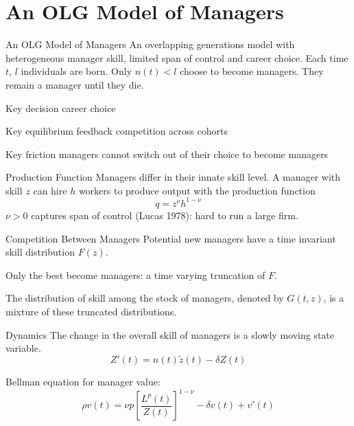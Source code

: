 \documentclass[
  ignorenonframetext,
  aspectratio=1610,
]{beamer}
\begin{document}
\hypertarget{an-olg-model-of-managers}{%
\section{An OLG Model of Managers}\label{an-olg-model-of-managers}}

\begin{frame}{An OLG Model of Managers}
\protect\hypertarget{an-olg-model-of-managers-1}{}
An overlapping generations model with heterogeneous manager skill,
limited span of control and career choice. Each time \(t\), \(l\)
individuals are born. Only \(n(t) < l\) choose to become managers. They
remain a manager until they die.

\begin{block}{Key decision}
\protect\hypertarget{key-decision}{}
career choice
\end{block}

\begin{block}{Key equilibrium feedback}
\protect\hypertarget{key-equilibrium-feedback}{}
competition across cohorts
\end{block}

\begin{block}{Key friction}
\protect\hypertarget{key-friction}{}
managers cannot switch out of their choice to become managers
\end{block}
\end{frame}

\begin{frame}{Production Function}
\protect\hypertarget{production-function}{}
Managers differ in their innate skill level. A manager with skill \(z\)
can hire \(h\) workers to produce output with the production function
\[q = z^\nu h^{1-\nu}\] \(\nu>0\) captures span of control (Lucas 1978):
hard to run a large firm.
\end{frame}

\begin{frame}{Competition Between Managers}
\protect\hypertarget{competition-between-managers}{}
Potential new managers have a time invariant skill distribution
\(F(z)\).

Only the best become managers: a time varying truncation of \(F\).

The distribution of skill among the stock of managers, denoted by
\(G(t, z)\), is a mixture of these truncated distributions.
\end{frame}

\begin{frame}{Dynamics}
\protect\hypertarget{dynamics}{}
The change in the overall skill of managers is a slowly moving state
variable. \[Z'(t) = n(t)\tilde z(t) - \delta Z(t)\]

Bellman equation for manager value:
\[\rho v(t) = \nu p \left[\frac {L^{p}(t)}{Z(t)}\right]^{1-\nu} - \delta v(t) + v'(t)\]
\end{frame}
\end{document}
